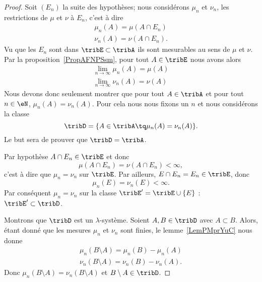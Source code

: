 \begin{proof}
    Soit \( (E_n)\) la suite des hypothèses; nous considérons \( \mu_n\) et \( \nu_n\), les restrictions de \( \mu\) et \( \nu\) à \( E_n\), c'est à dire
    \begin{subequations}
        \begin{align}
        \mu_n(A)=\mu(A\cap E_n)\\
        \nu_n(A)=\nu(A\cap E_n).
        \end{align}
    \end{subequations}
    Vu que les \( E_n\) sont dans \( \tribE\subset\tribA\) ils sont mesurables au sens de \( \mu\) et \( \nu\). Par la proposition~\ref{PropAFNPSsm}, pour tout \( A\in \tribE\) nous avons alors
    \begin{subequations}
        \begin{align}
            \lim_{n\to \infty} \mu_n(A)=\mu(A)\\
            \lim_{n\to \infty} \nu_n(A)=\nu(A)
        \end{align}
    \end{subequations}
    Nous devons donc seulement montrer que pour tout \( A\in\tribA\) et pour tout \( n\in\eN\), \( \mu_n(A)=\nu_n(A)\). Pour cela nous nous fixons un \( n\) et nous considérons la classe
    \begin{equation}
        \tribD=\{ A\in\tribA\tq\mu_n(A)=\nu_n(A) \}.
    \end{equation}
    Le but sera de prouver que \( \tribD=\tribA\).


    Par hypothèse \( A\cap E_n\in\tribE\) et donc
    \begin{equation}
        \mu(A\cap E_n)=\nu(A\cap E_n)<\infty,
    \end{equation}
    c'est à dire que \( \mu_n=\nu_n\) sur \( \tribE\). Par ailleurs, \( E\cap E_n=E_n\in\tribE\), donc
    \begin{equation}
        \mu_n(E)=\nu_n(E)<\infty.
    \end{equation}
    Par conséquent \( \mu_n=\nu_n\) sur la classe \( \tribE'=\tribE\cup\{ E \}\) : \( \tribE'\subset\tribD\).

    Montrons que \( \tribD\) est un \( \lambda\)-système. Soient \( A,B\in\tribD\) avec \( A\subset B\). Alors, étant donné que les mesures \( \mu_n\) et \( \nu_n\) sont finies, le lemme~\ref{LemPMprYuC} nous donne
    \begin{subequations}
        \begin{align}
            \mu_n(B\setminus A)=\mu_n(B)-\mu_n(A)\\
            \nu_n(B\setminus A)=\nu_n(B)-\nu_n(A).
        \end{align}
    \end{subequations}
    Donc \( \mu_n(B\setminus A)=\nu_n(B\setminus A)\) et \( B\setminus A\in\tribD\).


\end{proof}
